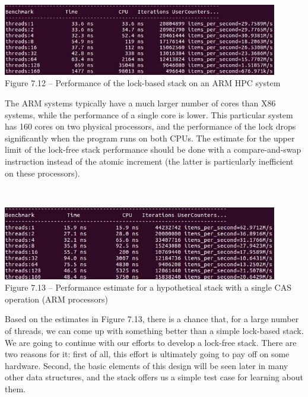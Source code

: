 \hspace*{\fill} \\ %
\begin{center}
\includegraphics[width=0.9\textwidth]{content/2/chapter7/images/12.jpg}\\
Figure 7.12 – Performance of the lock-based stack on an ARM HPC system
\end{center}

The ARM systems typically have a much larger number of cores than X86 systems, while the performance of a single core is lower. This particular system has 160 cores on two physical processors, and the performance of the lock drops significantly when the program runs on both CPUs. The estimate for the upper limit of the lock-free stack performance should be done with a compare-and-swap instruction instead of the atomic increment (the latter is particularly inefficient on these processors).

\hspace*{\fill} \\ %
\begin{center}
\includegraphics[width=0.9\textwidth]{content/2/chapter7/images/13.jpg}\\
Figure 7.13 – Performance estimate for a hypothetical stack with a single CAS operation (ARM processors)
\end{center}

Based on the estimates in Figure 7.13, there is a chance that, for a large number of threads, we can come up with something better than a simple lock-based stack. We are going to continue with our efforts to develop a lock-free stack. There are two reasons for it: first of all, this effort is ultimately going to pay off on some hardware. Second, the basic elements of this design will be seen later in many other data structures, and the stack offers us a simple test case for learning about them.

